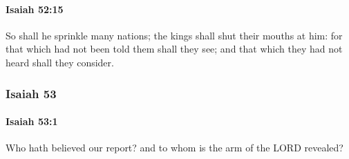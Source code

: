 		\paragraph{Isaiah 52:15} %
			\label{ISAIAH-52-15}

			So shall he sprinkle many nations; the kings shall shut their mouths at him: for that which had not been told them shall they see; and that which they had not heard shall they consider.

	\subsubsection{Isaiah 53} %
		\label{ISAIAH-53}

		\paragraph{Isaiah 53:1} %
			\label{ISAIAH-53-1}

			Who hath believed our report? and to whom is the arm of the LORD revealed?

